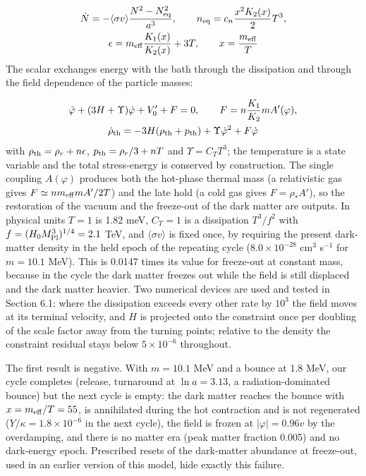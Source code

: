 \documentclass[pdflatex,sn-mathphys-num]{sn-jnl}
\begin{document}
\begin{equation}\begin{gathered}
\dot N=-\langle\sigma v\rangle\frac{N^2-N_{\rm eq}^2}{a^3},\qquad n_{\rm eq}=c_n\frac{x^2K_2(x)}{2}T^3,\\
\epsilon=m_{\rm eff}\frac{K_1(x)}{K_2(x)}+3T,\qquad x=\frac{m_{\rm eff}}{T}
\end{gathered}\end{equation}
The scalar exchanges energy with the bath through the dissipation and through the field dependence of the particle masses:

\begin{equation}\begin{gathered}
\ddot\varphi+(3H+\Upsilon)\dot\varphi+V_0'+F=0,\qquad F=n\frac{K_1}{K_2}mA'(\varphi),\\
\dot\rho_{\rm th}=-3H(\rho_{\rm th}+p_{\rm th})+\Upsilon\dot\varphi^2+F\dot\varphi
\end{gathered}\end{equation}
with $\rho_{\rm th}=\rho_r+n\epsilon$, $p_{\rm th}=\rho_r/3+nT$ and $\Upsilon=C_TT^3$; the temperature is a state variable and the total stress-energy is conserved by construction. The single coupling $A(\varphi)$ produces both the hot-phase thermal mass (a relativistic gas gives $F\simeq nm_{\rm eff}mA'/2T$) and the late hold (a cold gas gives $F=\rho_*A'$), so the restoration of the vacuum and the freeze-out of the dark matter are outputs. In physical units $T=1$ is 1.82 meV, $C_T=1$ is a dissipation $T^3/f^2$ with $f=(H_0M_{\rm Pl}^3)^{1/4}=2.1$ TeV, and $\langle\sigma v\rangle$ is fixed once, by requiring the present dark-matter density in the held epoch of the repeating cycle ($8.0\times10^{-28}$ cm$^3$ s$^{-1}$ for $m=10.1$ MeV). This is 0.0147 times its value for freeze-out at constant mass, because in the cycle the dark matter freezes out while the field is still displaced and the dark matter heavier. Two numerical devices are used and tested in Section 6.1: where the dissipation exceeds every other rate by $10^3$ the field moves at its terminal velocity, and $H$ is projected onto the constraint once per doubling of the scale factor away from the turning points; relative to the density the constraint residual stays below $5\times10^{-6}$ throughout.

The first result is negative. With $m=10.1$ MeV and a bounce at 1.8 MeV, our cycle completes (release, turnaround at $\ln a=3.13$, a radiation-dominated bounce) but the next cycle is empty: the dark matter reaches the bounce with $x=m_{\rm eff}/T=55$, is annihilated during the hot contraction and is not regenerated ($Y/\kappa=1.8\times10^{-6}$ in the next cycle), the field is frozen at $|\varphi|=0.96v$ by the overdamping, and there is no matter era (peak matter fraction 0.005) and no dark-energy epoch. Prescribed resets of the dark-matter abundance at freeze-out, used in an earlier version of this model, hide exactly this failure.
\end{document}
